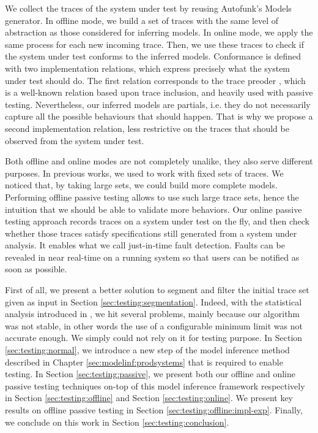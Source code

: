 We collect the traces of the system under test by reusing
Autofunk's Models generator. In offline mode, we build a set of
traces with the same level of abstraction as those considered for
inferring models. In online mode, we apply the same process for
each new incoming trace. Then, we use these traces to check if
the system under test conforms to the inferred models.
Conformance is defined with two implementation relations, which
express precisely what the system under test should do. The first
relation corresponds to the trace preoder \cite{DNH84}, which is
a well-known relation based upon trace inclusion, and heavily
used with passive testing.  Nevertheless, our inferred models are
partials, i.e.  they do not necessarily capture all the possible
behaviours that should happen. That is why we propose a second
implementation relation, less restrictive on the traces that
should be observed from the system under test.

Both offline and online modes are not completely unalike, they
also serve different purposes. In previous works, we used to work
with fixed sets of traces. We noticed that, by taking large sets,
we could build more complete models. Performing offline passive
testing allows to use such large trace sets, hence the intuition
that we should be able to validate more behaviors. Our online
passive testing approach records traces on a system under test on
the fly, and then check whether those traces satisfy
specifications still generated from a system under analysis. It
enables what we call just-in-time fault detection. Faults can be
revealed in near real-time on a running system so that users can
be notified as soon as possible.

First of all, we present a better solution to segment and filter
the initial trace set given as input in Section
\ref{sec:testing:segmentation}. Indeed, with the statistical
analysis introduced in
,
we hit several problems, mainly because our algorithm was not
stable, in other words the use of a configurable minimum limit
was not accurate enough. We simply could not rely on it for
testing purpose.  In Section \ref{sec:testing:normal}, we
introduce a new step of the model inference method described in
Chapter \ref{sec:modelinf:prodsystems} that is required to enable
testing. In Section \ref{sec:testing:passive}, we present both
our offline and online passive testing techniques on-top of this
model inference framework respectively in Section
\ref{sec:testing:offline} and Section \ref{sec:testing:online}.
We present key results on offline passive testing in Section
\ref{sec:testing:offline:impl-exp}.  Finally, we conclude on this
work in Section \ref{sec:testing:conclusion}.

